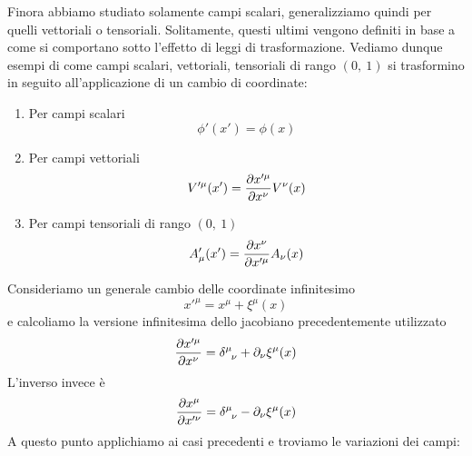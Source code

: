     Finora abbiamo studiato solamente campi scalari, generalizziamo quindi per quelli vettoriali o tensoriali. Solitamente, questi ultimi vengono definiti in base a come si comportano sotto l'effetto di leggi di trasformazione. Vediamo dunque esempi di come campi scalari, vettoriali, tensoriali di rango $(0,~1)$ si trasformino in seguito all'applicazione di un cambio di coordinate:
    \begin{enumerate}
        \item Per campi scalari
    \begin{equation*}
        \phi'(x') = \phi(x)
    \end{equation*}
        \item Per campi vettoriali
    \begin{equation*}
        V'^\mu(x') = \frac{\partial x'^\mu}{\partial x^\nu} V^\nu(x)
    \end{equation*}
        \item Per campi tensoriali di rango $(0,~1)$
    \begin{equation*}
        A'_\mu(x') = \frac{\partial x^\nu}{\partial x'^\mu} A_\nu(x)
    \end{equation*}
    \end{enumerate} 
        Consideriamo un generale cambio delle coordinate infinitesimo
    \begin{equation*}
        x'^\mu = x^\mu + \xi^\mu(x)
    \end{equation*}
        e calcoliamo la versione infinitesima dello jacobiano precedentemente utilizzato 
    \begin{equation*}
        \pdv{x'^\mu}{x^\nu} = \delta^{\mu}_{\phantom \mu \nu} + \partial_\nu \xi^\mu(x)
    \end{equation*}
        L'inverso invece è 
    \begin{equation*}
        \pdv{x^\mu}{x'^\nu} = \delta^{\mu}_{\phantom \mu \nu} - \partial_\nu \xi^\mu(x)
    \end{equation*}
        A questo punto applichiamo ai casi precedenti e troviamo le variazioni dei campi:
